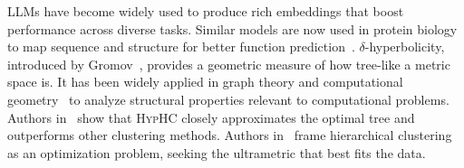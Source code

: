 \documentclass[]{Liebert_Author_revised}
\begin{document}
LLMs have become widely used to produce rich embeddings that boost performance across diverse tasks. Similar models are now used in protein biology to map sequence and structure for better function prediction~\citeauthor{ali2023protein}.
$\delta$-hyperbolicity, introduced by Gromov~\citeauthor{gromov1987hyperbolic}, provides a geometric measure of how tree-like a metric space is. It has been widely applied in graph theory and computational geometry~\citeauthor{krioukov2010hyperbolic} to analyze structural properties relevant to computational problems.
Authors in~\citeauthor{chami2020trees} show that H\textsc{yp}HC closely approximates the optimal tree and outperforms other clustering methods.
Authors in~\citeauthor{chierchia2019ultrametric} frame hierarchical clustering as an optimization problem, seeking the ultrametric that best fits the data. 
\end{document}
